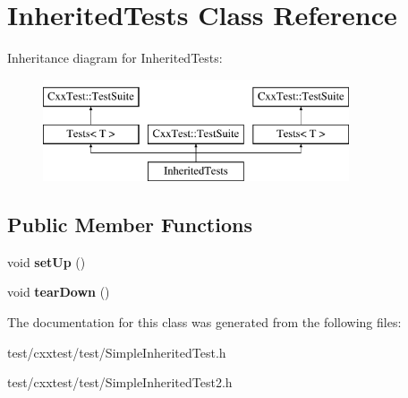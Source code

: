 \hypertarget{classInheritedTests}{\section{Inherited\-Tests Class Reference}
\label{classInheritedTests}
}
Inheritance diagram for Inherited\-Tests\-:\begin{figure}[H]
\begin{center}
\leavevmode
\includegraphics[height=3.000000cm]{classInheritedTests}
\end{center}
\end{figure}
\subsection*{Public Member Functions}
\begin{DoxyCompactItemize}
\item 
\hypertarget{classInheritedTests_a1a5d3086330054a540f4129e686aab35}{void {\bfseries set\-Up} ()}\label{classInheritedTests_a1a5d3086330054a540f4129e686aab35}

\item 
\hypertarget{classInheritedTests_a9b87f118e7cf7b93d77eb9d8b9ea5da4}{void {\bfseries tear\-Down} ()}\label{classInheritedTests_a9b87f118e7cf7b93d77eb9d8b9ea5da4}

\end{DoxyCompactItemize}


The documentation for this class was generated from the following files\-:\begin{DoxyCompactItemize}
\item 
test/cxxtest/test/Simple\-Inherited\-Test.\-h\item 
test/cxxtest/test/Simple\-Inherited\-Test2.\-h\end{DoxyCompactItemize}

